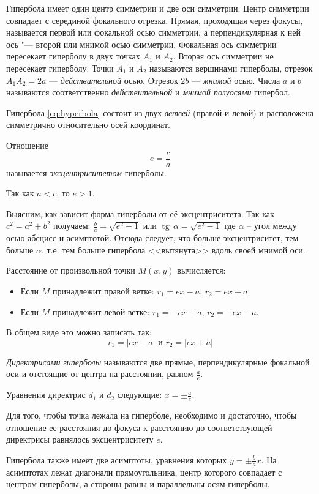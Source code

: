 Гипербола имеет один центр симметрии и две оси симметрии. Центр симметрии совпадает с серединой фокального отрезка. Прямая, проходящая через фокусы, называется первой или фокальной осью симметрии, а перпендикулярная к ней ось "--- второй или мнимой осью симметрии. Фокальная ось
симметрии пересекает гиперболу в двух точках $A_1$ и $A_2$. Вторая ось симметрии не пересекает гиперболу. Точки $A_1$ и $A_2$ называются вершинами гиперболы, отрезок
$A_1A_2 = 2a$ — \textit{действительной} осью. Отрезок $2b$ — \textit{мнимой} осью. Числа $a$ и $b$
называются соответственно \textit{действительной} и \textit{мнимой полуосями} гипербол.

Гипербола \ref{eq:hyperbola} состоит из двух \textit{ветвей} (правой и левой) и расположена
симметрично относительно осей координат.

Отношение
$$
  e = \frac{c}{a}
$$ называется \textit{эксцентриситетом} гиперболы.

Так как $a < c$, то $e > 1$.

Выясним, как зависит форма гиперболы от её эксцентриситета. Так как $c^2 = a^2 + b^2$ получаем: $\frac{b}{a} =\sqrt{e^2 - 1}$ или $\operatorname{tg}\, \alpha = \sqrt{e^2 - 1}$
где $\alpha$ – угол между осью
абсцисс и асимптотой. Отсюда следует, что больше эксцентриситет, тем больше $\alpha$, т.е. тем больше гипербола <<вытянута>> вдоль своей мнимой оси.

Расстояние от произвольной точки $M(x,y)$ вычисляется:
\begin{itemize}
  \item Если $M$ принадлежит правой ветке: $r_1 = ex - a$, $r_2 = ex + a$.
  \item Если $M$ принадлежит левой ветке: $r_1 = -ex + a$, $r_2 = -ex - a$.
\end{itemize}
В общем виде это можно записать так:
$$
  r_1 = \mathopen|ex - a\mathclose| \text{ и } r_2 = \mathopen|ex + a\mathclose|
$$

\begin{definition}
  \textit{Директрисами гиперболы} называются две прямые, перпендикулярные фокальной оси и отстоящие от центра на расстоянии, равном $\frac{a}{e}$.

  Уравнения директрис $d_1$ и $d_2$ следующие: $x = \pm \frac{a}{e}$.
\end{definition}
Для того, чтобы точка лежала на
гиперболе, необходимо и достаточно, чтобы отношение ее
расстояния до фокуса к расстоянию до соответствующей
директрисы равнялось эксцентриситету $e$.

Гипербола также имеет две асимптоты, уравнения которых $y = \pm \frac{b}{a}x$. На асимптотах лежат диагонали прямоугольника, центр которого совпадает с центром
гиперболы, а стороны равны и параллельны осям гиперболы.

